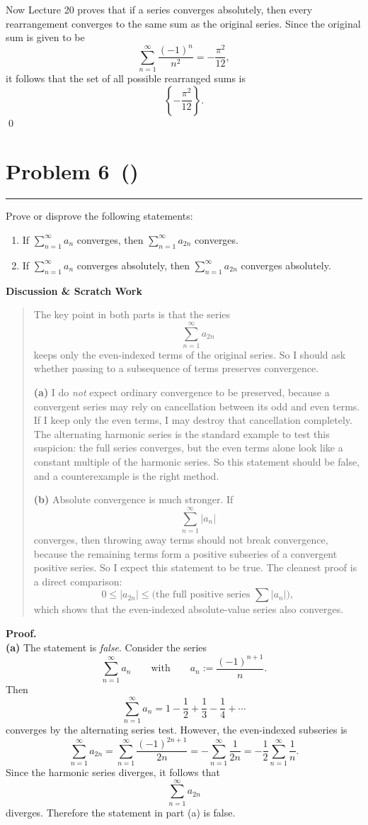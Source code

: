 \documentclass[12pt]{article}
\makeatletter
\newenvironment{scratch}{%
  \par\smallskip
  \noindent\textbf{Discussion \& Scratch Work}\begin{quote}\small
}{%
  \end{quote}\smallskip
}
\newcommand{\problem}[2][]{%
  \def\prob@title{Problem #2\if\relax\detokenize{#1}\relax\else\ (\textit{#1})\fi}%
  \phantomsection%
  \pdfbookmark[1]{\prob@title}{prob#2}%
  \addcontentsline{toc}{section}{\prob@title}%
  \section*{\prob@title}%
  \vspace{-0.25em}\hrule\vspace{0.8em}%
}
\makeatother
\begin{document}
Now Lecture 20 proves that if a series converges absolutely, then every rearrangement converges to the same sum as the original series. Since the original sum is given to be
\[
\sum_{n=1}^{\infty} \frac{(-1)^n}{n^2} = -\frac{\pi^2}{12},
\]
it follows that the set of all possible rearranged sums is
\[
\left\{-\frac{\pi^2}{12}\right\}.
\]
\qed

\newpage

\problem[]{6}
Prove or disprove the following statements:
\begin{enumerate}[label=\textbf{(\alph*)}]
\item If $\sum_{n=1}^{\infty} a_n$ converges, then $\sum_{n=1}^{\infty} a_{2n}$
converges.
\item If $\sum_{n=1}^{\infty} a_n$ converges absolutely, then
$\sum_{n=1}^{\infty} a_{2n}$ converges absolutely.
\end{enumerate}

\begin{scratch}
The key point in both parts is that the series
\[
\sum_{n=1}^{\infty} a_{2n}
\]
keeps only the even-indexed terms of the original series. So I should ask whether passing to a subsequence of terms preserves convergence.

\textbf{(a)} I do \emph{not} expect ordinary convergence to be preserved, because a convergent series may rely on cancellation between its odd and even terms. If I keep only the even terms, I may destroy that cancellation completely. The alternating harmonic series is the standard example to test this suspicion: the full series converges, but the even terms alone look like a constant multiple of the harmonic series. So this statement should be false, and a counterexample is the right method.

\textbf{(b)} Absolute convergence is much stronger. If
\[
\sum_{n=1}^{\infty} |a_n|
\]
converges, then throwing away terms should not break convergence, because the remaining terms form a positive subseries of a convergent positive series. So I expect this statement to be true. The cleanest proof is a direct comparison:
\[
0\le |a_{2n}| \le \text{(the full positive series } \sum |a_n|\text{)},
\]
which shows that the even-indexed absolute-value series also converges.
\end{scratch}

\textbf{Proof.}\\
\textbf{(a)} The statement is \emph{false}. Consider the series
\[
\sum_{n=1}^{\infty} a_n
\qquad\text{with}
\qquad
 a_n := \frac{(-1)^{n+1}}{n}.
\]
Then
\[
\sum_{n=1}^{\infty} a_n = 1-\frac12+\frac13-\frac14+\cdots
\]
converges by the alternating series test. However, the even-indexed subseries is
\[
\sum_{n=1}^{\infty} a_{2n}
= \sum_{n=1}^{\infty} \frac{(-1)^{2n+1}}{2n}
= -\sum_{n=1}^{\infty} \frac{1}{2n}
= -\frac12\sum_{n=1}^{\infty} \frac{1}{n}.
\]
Since the harmonic series diverges, it follows that
\[
\sum_{n=1}^{\infty} a_{2n}
\]
diverges. Therefore the statement in part (a) is false.
\end{document}

